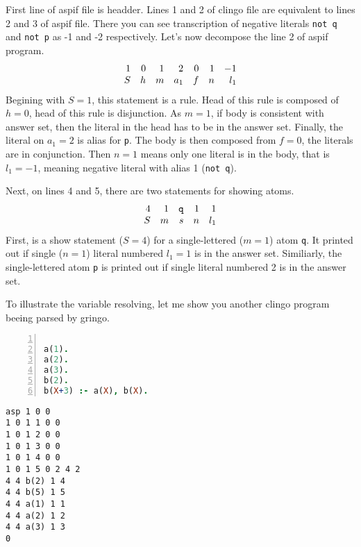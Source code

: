 \documentclass{fithesis}
\begin{document}
First line of aspif file is headder. Lines 1 and 2 of clingo file are
equivalent to lines 2 and 3 of aspif file. There you can see transcription
of negative literals \texttt{not q} and \texttt{not p} as -1 and -2
respectively. Let's now decompose the line 2 of aspif program.
\begin{equation*}
    \begin{array}{r rrr rrr}
        1 & 0 & 1 & 2 & 0 & 1 & -1\\
        S & h & m & a_1 & f & n & l_1\\
    \end{array}
\end{equation*}
Begining with $S=1$, this statement is a rule. Head of this rule is composed
of $h=0$, head of this rule is disjunction. As $m=1$, if body is consistent
with answer set, then the literal in the head has to be in the answer set.
Finally, the literal on $a_1=2$ is alias for \texttt{p}.
The body is then composed from $f=0$, the literals are in conjunction.
Then $n=1$ means only one literal is in the body, that is $l_1=-1$, meaning
negative literal with alias 1 (\texttt{not q}).

Next, on lines 4 and 5, there are two statements for showing atoms.
\begin{equation*}
    \begin{array}{r rr rr}
        4 & 1 & \texttt{q} & 1 & 1\\
        S & m & s & n & l_1\\
    \end{array}
\end{equation*}
First, is a show statement ($S=4$) for a single-lettered ($m=1$)
atom \texttt{q}. It printed out if single ($n=1$) literal
numbered $l_1=1$ is in the answer set. Similiarly, the single-lettered atom
\texttt{p} is printed out if single literal numbered 2 is in the answer set.

To illustrate the variable resolving, let me show you another clingo program
beeing parsed by gringo.

\begin{minipage}[t]{0.45\linewidth}
\centering
\begin{lstlisting}[language=prolog, numbers=left, countblanklines=false]

a(1).
a(2).
a(3).
b(2).
b(X+3) :- a(X), b(X).
\end{lstlisting}
\end{minipage}
\hspace{1em}
\begin{minipage}[t]{0.45\linewidth}
\centering
\begin{lstlisting}[numbers=right, countblanklines=false]
asp 1 0 0
1 0 1 1 0 0
1 0 1 2 0 0
1 0 1 3 0 0
1 0 1 4 0 0
1 0 1 5 0 2 4 2
4 4 b(2) 1 4
4 4 b(5) 1 5
4 4 a(1) 1 1
4 4 a(2) 1 2
4 4 a(3) 1 3
0
\end{lstlisting}
\end{minipage}
\end{document}
